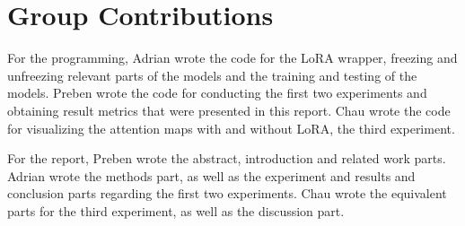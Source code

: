 \documentclass[10pt]{article}
\begin{document}
\section{Group Contributions}

For the programming, Adrian wrote the code for the LoRA wrapper, freezing and unfreezing relevant parts of the models and the training and testing of the models. Preben wrote the code for conducting the first two experiments and obtaining result metrics that were presented in this report. Chau wrote the code for visualizing the attention maps with and without LoRA, the third experiment.

For the report, Preben wrote the abstract, introduction and related work parts. Adrian wrote the methods part, as well as the experiment and results and conclusion parts regarding the first two experiments. Chau wrote the equivalent parts for the third experiment, as well as the discussion part.



\end{document}
